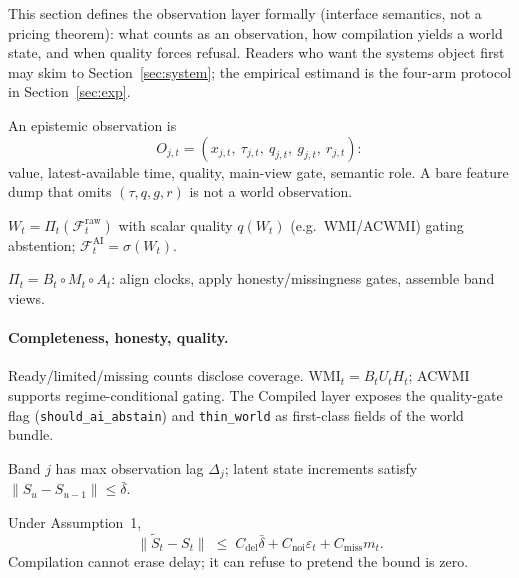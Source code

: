\documentclass[sigconf,anonymous]{acmart}
\theoremstyle{acmdefinition}%
\theoremstyle{acmplain}%
\begin{document}
This section defines the observation layer formally (interface semantics, not a pricing theorem): what counts as an observation, how compilation yields a world state, and when quality forces refusal. Readers who want the systems object first may skim to Section~\ref{sec:system}; the empirical estimand is the four-arm protocol in Section~\ref{sec:exp}.

\begin{definition}
An epistemic observation is
\[
O_{j,t}=(x_{j,t},\ \tau_{j,t},\ q_{j,t},\ g_{j,t},\ r_{j,t}):
\]
value, latest-available time, quality, main-view gate, semantic role.
A bare feature dump that omits \((\tau,q,g,r)\) is not a world observation.
\end{definition}

\begin{definition}
\(W_t=\Pi_t(\mathcal{F}^{\mathrm{raw}}_t)\) with scalar quality \(q(W_t)\) (e.g.\ WMI/ACWMI) gating abstention; \(\mathcal{F}^{\mathrm{AI}}_t=\sigma(W_t)\).
\end{definition}

\begin{definition}[Compilation]
\(\Pi_t=B_t\circ M_t\circ A_t\): align clocks, apply honesty/missingness gates, assemble band views.
\end{definition}

\paragraph{Completeness, honesty, quality.}
Ready/limited/missing counts disclose coverage. \(\mathrm{WMI}_t=B_t U_t H_t\); ACWMI supports regime-conditional gating. The Compiled layer exposes the quality-gate flag (\texttt{should\_ai\_abstain}) and \texttt{thin\_world} as first-class fields of the world bundle.

\begin{assumption}
Band \(j\) has max observation lag \(\Delta_j\); latent state increments satisfy \(\|S_u-S_{u-1}\|\le\bar\delta\).
\end{assumption}

\begin{proposition}
\label{prop:recon}
Under Assumption~1,
\[
\|\widetilde S_t-S_t\|
\;\le\;
C_{\mathrm{del}}\bar\delta
+C_{\mathrm{noi}}\varepsilon_t
+C_{\mathrm{miss}}m_t.
\]
Compilation cannot erase delay; it can refuse to pretend the bound is zero.
\end{proposition}
\end{document}
